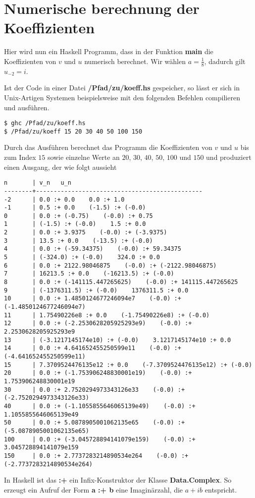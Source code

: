 \chapter{Numerische berechnung der Koeffizienten} \label{anh:Programm}
Hier wird nun ein Haskell Programm, dass in der Funktion \textbf{main} die
Koeffizienten von $v$ und $u$ numerisch berechnet. Wir wählen $a=\frac{1}{8}$,
dadurch gilt $u_{-2}=i$.


Ist der Code in einer Datei \textbf{/Pfad/zu/koeff.hs} gespeicher, so lässt er
sich in Unix-Artigen Systemen beispielsweise mit den folgenden Befehlen
compilieren und ausführen.
\begin{lstlisting}[style=Bash]
$ ghc /Pfad/zu/koeff.hs
$ /Pfad/zu/koeff 15 20 30 40 50 100 150
\end{lstlisting}
Durch das Ausführen berechnet das Programm die Koeffizienten von $v$ und $u$
bis zum Index $15$ sowie einzelne Werte an $20$, $30$, $40$, $50$, $100$ und
$150$ und produziert einen Ausgang, der wie folgt aussieht
\begin{lstlisting}[style=Bash]
n       | v_n   u_n
--------+-----------------------------------------------
-2      | 0.0 :+ 0.0    0.0 :+ 1.0
-1      | 0.5 :+ 0.0    (-1.5) :+ (-0.0)
0       | 0.0 :+ (-0.75)    (-0.0) :+ 0.75
1       | (-1.5) :+ (-0.0)    1.5 :+ 0.0
2       | 0.0 :+ 3.9375    (-0.0) :+ (-3.9375)
3       | 13.5 :+ 0.0    (-13.5) :+ (-0.0)
4       | 0.0 :+ (-59.34375)    (-0.0) :+ 59.34375
5       | (-324.0) :+ (-0.0)    324.0 :+ 0.0
6       | 0.0 :+ 2122.98046875    (-0.0) :+ (-2122.98046875)
7       | 16213.5 :+ 0.0    (-16213.5) :+ (-0.0)
8       | 0.0 :+ (-141115.447265625)    (-0.0) :+ 141115.447265625
9       | (-1376311.5) :+ (-0.0)    1376311.5 :+ 0.0
10      | 0.0 :+ 1.4850124677246094e7    (-0.0) :+ (-1.4850124677246094e7)
11      | 1.75490226e8 :+ 0.0    (-1.75490226e8) :+ (-0.0)
12      | 0.0 :+ (-2.2530628205925293e9)    (-0.0) :+ 2.2530628205925293e9
13      | (-3.1217145174e10) :+ (-0.0)    3.1217145174e10 :+ 0.0
14      | 0.0 :+ 4.641652455250599e11    (-0.0) :+ (-4.641652455250599e11)
15      | 7.3709524476135e12 :+ 0.0    (-7.3709524476135e12) :+ (-0.0)
20      | 0.0 :+ (-1.753906248830001e19)    (-0.0) :+ 1.753906248830001e19
30      | 0.0 :+ 2.7520294973343126e33    (-0.0) :+ (-2.7520294973343126e33)
40      | 0.0 :+ (-1.1055855646065139e49)    (-0.0) :+ 1.1055855646065139e49
50      | 0.0 :+ 5.0878905001062135e65    (-0.0) :+ (-5.0878905001062135e65)
100     | 0.0 :+ (-3.045728894141079e159)    (-0.0) :+ 3.045728894141079e159
150     | 0.0 :+ 2.7737283214890534e264    (-0.0) :+ (-2.7737283214890534e264)
\end{lstlisting}
In Haskell ist das \textbf{:+} ein Infix-Konstruktor der Klasse
\textbf{Data.Complex}. So erzeugt ein Aufruf der Form \textbf{a :+ b} eine
Imaginärzahl, die $a+ib$ entspricht.

